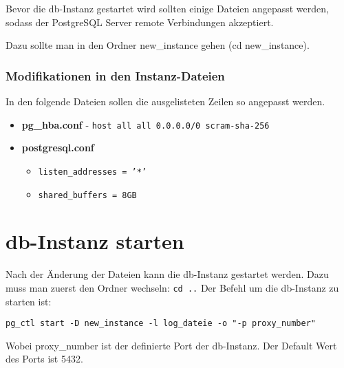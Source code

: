 	Bevor die \ac{db}-Instanz gestartet wird sollten einige Dateien angepasst werden, sodass der PostgreSQL Server remote Verbindungen akzeptiert.
	
	Dazu sollte man in den Ordner new\_instance gehen (cd new\_instance).

    \subsubsection{Modifikationen in den Instanz-Dateien}

    In den folgende Dateien sollen die ausgelisteten Zeilen so angepasst werden.
    \begin{itemize}
    	\item \textbf{pg\_hba.conf} - \texttt{host    all     all     0.0.0.0/0       scram-sha-256}
    	\item \textbf{postgresql.conf}
    	\begin{itemize}
    		\item \texttt{listen\_addresses = '*'}
    		\item \texttt{shared\_buffers = 8GB}
    	\end{itemize} 
    \end{itemize}

    \section{\acs{db}-Instanz starten}
    
    Nach der Änderung der Dateien kann die \ac{db}-Instanz gestartet werden. Dazu muss man zuerst den Ordner wechseln: \texttt{cd ..} Der Befehl um die \ac{db}-Instanz zu starten ist:
    
    \texttt{pg\_ctl start -D new\_instance -l log\_dateie -o "-p proxy\_number"}
    
    Wobei proxy\_number ist der definierte Port der \ac{db}-Instanz. Der Default Wert des Ports ist 5432.